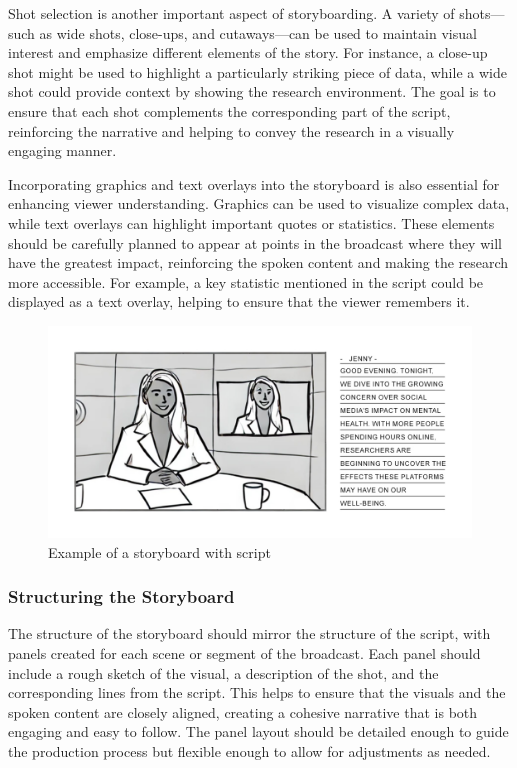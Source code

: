 \documentclass[
]{book}
\begin{document}
Shot selection is another important aspect of storyboarding. A variety of shots---such as wide shots, close-ups, and cutaways---can be used to maintain visual interest and emphasize different elements of the story. For instance, a close-up shot might be used to highlight a particularly striking piece of data, while a wide shot could provide context by showing the research environment. The goal is to ensure that each shot complements the corresponding part of the script, reinforcing the narrative and helping to convey the research in a visually engaging manner.

Incorporating graphics and text overlays into the storyboard is also essential for enhancing viewer understanding. Graphics can be used to visualize complex data, while text overlays can highlight important quotes or statistics. These elements should be carefully planned to appear at points in the broadcast where they will have the greatest impact, reinforcing the spoken content and making the research more accessible. For example, a key statistic mentioned in the script could be displayed as a text overlay, helping to ensure that the viewer remembers it.

\begin{figure}
\centering
\includegraphics[width=1\linewidth,height=\textheight,keepaspectratio]{images/storyboard-script.jpg}
\caption{Example of a storyboard with script}
\end{figure}

\subsubsection*{Structuring the Storyboard}\label{structuring-the-storyboard}

The structure of the storyboard should mirror the structure of the script, with panels created for each scene or segment of the broadcast. Each panel should include a rough sketch of the visual, a description of the shot, and the corresponding lines from the script. This helps to ensure that the visuals and the spoken content are closely aligned, creating a cohesive narrative that is both engaging and easy to follow. The panel layout should be detailed enough to guide the production process but flexible enough to allow for adjustments as needed.
\end{document}
